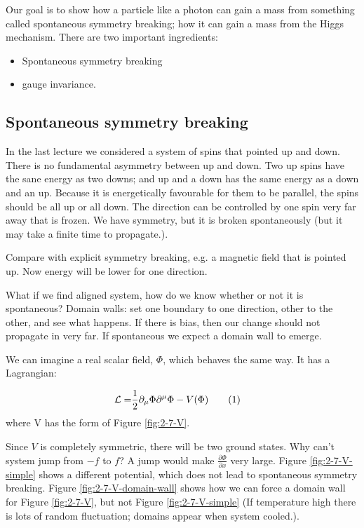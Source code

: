 \documentclass[]{article}
\newcommand\numberthis{\addtocounter{equation}{1}\tag{\theequation}}
\begin{document}
Our goal is to show how a particle like a photon can gain a mass from something called spontaneous symmetry breaking; how it can gain a mass from the Higgs mechanism. There are two important ingredients:

\begin{itemize}
	\item Spontaneous symmetry breaking
	\item gauge invariance.
\end{itemize}

\subsection{Spontaneous symmetry breaking}
In the last lecture we considered a system of spins that pointed up and down.
There is no fundamental asymmetry between up and down. Two up spins have the sane energy as two downs; and up and a down has the same energy as a down and an up. Because it is energetically favourable for them to be parallel, the spins should be all up or all down. The direction can be controlled by one spin very far away that is frozen. We have symmetry, but it is broken spontaneously (but it may take a finite time to propagate.).

Compare with explicit symmetry breaking, e.g. a magnetic field that is pointed up. Now energy will be lower for one direction.

What if we find aligned system, how do we know whether or not it is spontaneous? Domain walls: set one boundary to one direction, other to the other, and see what happens. If there is bias, then our change should not propagate in very far. If spontaneous we expect a domain wall to emerge.

We can imagine a real scalar field, $\Phi$, which behaves the same way. It has a Lagrangian:

\begin{align*}
	\mathcal{L} =& \frac{1}{2} \partial_\mu \Phi \partial^\mu \Phi - V(\Phi) \numberthis \label{eq:spontaneous:symmetry:L}
\end{align*}
where V has the form of Figure \ref{fig:2-7-V}.

Since $V$ is completely symmetric, there will be two ground states. Why can't system jump from $-f$ to $f$? A jump would make $\frac{\partial \Phi}{\partial x}$ very large. Figure \ref{fig:2-7-V-simple} shows a different potential, which does not lead to spontaneous symmetry breaking. Figure \ref{fig:2-7-V-domain-wall} shows how we can force a domain wall for Figure \ref{fig:2-7-V}, but not Figure \ref{fig:2-7-V-simple} (If temperature high there is lots of random fluctuation; domains appear when system cooled.).
\end{document}
